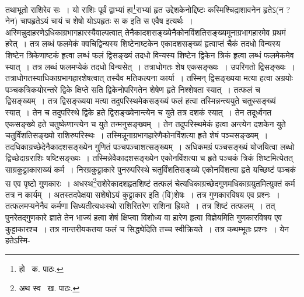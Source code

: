 \documentclass[11pt, openany]{book}
\begin{document}
\noindent तथाभूतो राशिरेव सः~। यो राशिः पूर्वं द्वाभ्यां हा\renewcommand{\thefootnote}{१}\footnote{हो \textendash\ क. पाठः.}राभ्यां हृत उद्देशकेनोद्दिष्टः कस्मिश्चिद्राशावनेन हृतेऽ(न ? नेन) चापहृतेऽयं चायं च शेषो योऽपहृतः स क इति स एवैष इत्यर्थः~। अस्मिन्नुदाहरणेऽधिकाग्रभागहारस्यैवाल्पत्वात् तेनैकादशसङ्ख्येनैकोनविंशतिसङ्ख्यमूनाग्रभागहारमेव प्रथमं हरेत्~। तत्र लब्धं फलमेकं क्वचिद्विन्यस्य शिष्टेनाष्टकेन एकादशसङ्ख्यं हृत्वाप्तं चैकं तदधो विन्यस्य शिष्टेन त्रिकेणाष्टकं हृत्वा लब्धं फलं द्विसङ्ख्यं तदधो विन्यस्य शिष्टेन द्विकेन त्रिकं हृत्वा लब्धं फलमेकमेव स्यात्~। तत्र लब्धं फलमप्येकं तदधो विन्यसेत्~। तत्राधोगतः शेष एकसङ्ख्यः~। उपरिगतो द्विसङ्ख्यः~। तत्राधोगतस्याधिकाग्रभागहारशेषत्वात् तस्यैव मतिकल्पना कार्या~। तस्मिन् द्विसङ्ख्यया मत्या हत्वा अग्रयोः पञ्चकत्रिकयोरन्तरे द्विके क्षिप्ते सति द्विकेनोपरिगतेन शेषेण हृते निश्शेषता स्यात्~। तत्फलं च द्विसङ्ख्यम्~। तत्र द्विसङ्ख्यया मत्या तदुपरिस्थमेकसङ्ख्यं फलं हत्वा तस्मिन्नन्त्ययुते चतुस्सङ्ख्यं स्यात्~। तेन च तदुपरिस्थे द्विके हते द्विसङ्ख्येनान्त्येन च युते तत्र दशकं स्यात्~। तेन तदूर्ध्वगत एकसङ्ख्ये हते चतुष्केणान्त्येन च युते तन्मनुसङ्ख्यम्~। तेन तदुपरिस्थमेकं हत्वा अन्त्येन दशकेन युते चतुर्विंशतिसङ्ख्यो राशिरुपरिस्थः~। तस्मिन्नूनाग्रभागहारेणैकोनविंशत्या हृते शेषं पञ्चसङ्ख्यम्~। तदधिकाग्रच्छेदेनैकादशसङ्ख्येन गुणितं पञ्चपञ्चाशत्सङ्ख्यम्~। अधिकमग्रं पञ्चसङ्ख्यं योजयित्वा लब्धो द्विच्छेदाग्रराशिः षष्टिसङ्ख्यः~। तस्मिन्नेवैकादशसङ्ख्येन एकोनविंशत्या च हृते पञ्चकं त्रिकं शिष्टमित्येतत् साग्रकुट्टाकाराख्यं कर्म~। निरग्रकुट्टाकारे पुनरुपरिस्थे चतुर्विंशतिसङ्ख्ये एकोनविंशत्या हृते यच्छिष्टं पञ्चकं स एव पृष्टो गुणकारः~। अधस्थ\renewcommand{\thefootnote}{२}\footnote{अथ स्व \textendash\ ख. पाठः.}राशेरेकादशहृतशिष्टं तत्फलं चेत्यधिकाग्रच्छेदगुणमधिकाग्रयुतमित्युक्तं कर्म तत्र न कार्यम्~। अतस्तदपेक्षया सशेषोऽयं कुट्टाकार इति (वि)शेषः~। तत्र गुणकारविषय एव प्रश्नः~। तत्फलमप्यनेनैव कर्मणा सिध्यतीत्यधःस्थो राशिरितरेण राशिना ह्रियते~। तत्र शिष्टं तत्फलम्~। तत् पुनरेतद्गुणकारे ज्ञाते तेन भाज्यं हत्वा शेषं क्षिप्त्वा विशोध्य वा हारेण हृत्वा विज्ञेयमिति गुणकारविषय एव कुट्टाकारश्च~। तत्र नान्तरीयकतया फलं च सिद्ध्येदिति तच्च स्वीक्रियते~। तत्र कथम्भूतः प्रश्नः~। येन हतेऽस्मि-

\newpage
\end{document}
